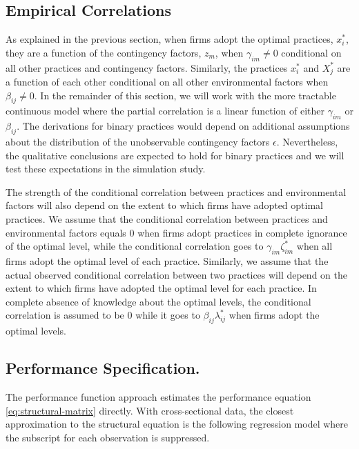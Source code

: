 \documentclass[12pt]{article}
\begin{document}
\subsection{Empirical Correlations}

As explained in the previous section, when firms adopt the optimal practices, $x^*_i$, they are a function of the contingency factors, $z_m$, when $\gamma_{im} \neq 0$ conditional on all other practices and contingency factors. Similarly, the practices $x^*_i$ and $X^*_j$ are a function of each other conditional on all other environmental factors when $\beta_{ij} \neq 0$. In the remainder of this section, we will work with the more tractable continuous model where the partial correlation is a linear function of either $\gamma_{im}$ or $\beta_{ij}$. The derivations for binary practices would depend on additional assumptions about the distribution of the unobservable contingency factors $\epsilon$. Nevertheless, the qualitative conclusions are expected to hold for binary practices and we will test these expectations in the simulation study.

The strength of the conditional correlation between practices and environmental factors will also depend on the extent to which firms have adopted optimal practices. We assume that the conditional correlation between practices and environmental factors equals $0$ when firms adopt practices in complete ignorance of the optimal level, while the conditional correlation goes to $\gamma_{im}\zeta_{im}^*$ when all firms adopt the optimal level of each practice. Similarly, we assume that the actual observed conditional correlation between two practices will depend on the extent to which firms have adopted the optimal level for each practice. In complete absence of knowledge about the optimal levels, the conditional correlation is assumed to be $0$ while it goes to $\beta_{ij}\lambda_{ij}^*$ when firms adopt the optimal levels. 

\subsection{Performance Specification.}\label{the-performance-specification.}

The performance function approach estimates the performance equation \eqref{eq:structural-matrix} directly. With cross-sectional data, the closest approximation to the structural equation is the following regression model where the subscript for each observation is suppressed. 
\end{document}

